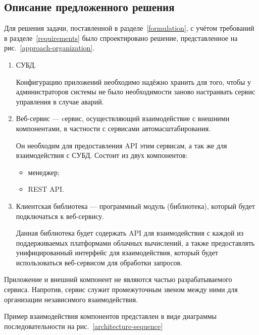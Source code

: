 \subsection{Описание предложенного решения}
Для решения задачи, поставленной в разделе~\ref{formulation}, с учётом требований в разделе~\ref{requirements} было спроектировано решение, представленное на рис.~\ref{approach-organization}.
\begin{enumerate}
    \item СУБД.
    
    Конфигурацию приложений необходимо надёжно хранить для того, чтобы у администраторов системы не было необходимости заново настраивать сервис управления в случае аварий.
    
    \item Веб-сервис --- cервис, осуществляющий взаимодействие с внешними компонентами, в частности с сервисами автомасштабирования. 
    
    Он необходим для предоставления API этим сервисам, а так же для взаимодействия с СУБД.
    Состоит из двух компонентов: 
    \begin{itemize}
        \item менеджер;
        \item REST API.
    \end{itemize}
    \item Клиентская библиотека --- программный модуль (библиотека), который будет подключаться к веб-сервису.
    
    Данная библиотека будет содержать API для взаимодействия с каждой из поддерживаемых платформами облачных вычислений, а также предоставлять унифицированный интерфейс для взаимодействия, который будет использоваться веб-сервисом для обработки запросов.
\end{enumerate}

Приложение и внешний компонент не являются частью разрабатываемого сервиса.
Напротив, сервис служит промежуточным звеном между ними для организации независимого взаимодействия.

Пример взаимодействия компонентов представлен в виде диаграммы последовательности на рис.~\ref{architecture-sequence}

